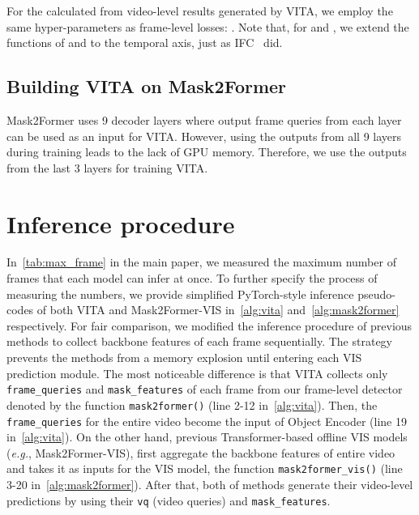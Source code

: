 \documentclass{article}
\begin{document}
For the  calculated from video-level results generated by VITA, we employ the same hyper-parameters as frame-level losses: . Note that, for  and , we extend the functions of  and  to the temporal axis, just as IFC~\cite{IFC} did.

\subsection{Building VITA on Mask2Former}
\label{supp:vita}
Mask2Former uses 9 decoder layers where output frame queries from each layer can be used as an input for VITA.
However, using the outputs from all 9 layers during training leads to the lack of GPU memory.
Therefore, we use the outputs from the last 3 layers for training VITA.



\section{Inference procedure}
\label{supp:inference}
In~\cref{tab:max_frame} in the main paper, we measured the maximum number of frames that each model can infer at once.
To further specify the process of measuring the numbers, we provide simplified PyTorch-style inference pseudo-codes of both VITA and Mask2Former-VIS in~\cref{alg:vita} and~\cref{alg:mask2former} respectively.
For fair comparison, we modified the inference procedure of previous methods to collect backbone features of each frame sequentially. 
The strategy prevents the methods from a memory explosion until entering each VIS prediction module.
The most noticeable difference is that VITA collects only \texttt{frame_queries} and \texttt{mask_features} of each frame from our frame-level detector~\cite{Mask2Former} denoted by the function \texttt{mask2former()} (line 2-12 in~\cref{alg:vita}).
Then, the \texttt{frame_queries} for the entire video become the input of Object Encoder (line 19 in~\cref{alg:vita}).
On the other hand, previous Transformer-based offline VIS models (\textit{e.g.}, Mask2Former-VIS), first aggregate the backbone features of entire video and takes it as inputs for the VIS model, the function \texttt{mask2former_vis()} (line 3-20 in~\cref{alg:mask2former}).
After that, both of methods generate their video-level predictions by using their \texttt{vq} (video queries) and \texttt{mask_features}.
\end{document}
